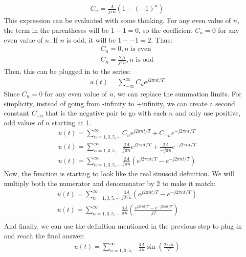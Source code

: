 \documentclass[12 pt]{article}
\begin{document}
\begin{align*}
    C_n=\frac{A}{j\pi n}\left(1-(-1)^n\right)
\end{align*}
This expression can be evaluated with some thinking. For any even value of $n$, the term in the parentheses will be
$1-1=0$, so the coefficient $C_n=0$ for any even value of $n$. If $n$ is odd, it will be $1--1=2$. Thus:
\begin{align*}
    C_n = 0, n \text{ is even} \\
    C_n =\frac{2A}{j\pi n}, n \text{ is odd}
\end{align*}
Then, this can be plugged in to the series:
\begin{align*}
    u(t)=\sum_{-\infty}^{\infty}C_ne^{j2\pi nt/T}
\end{align*}
Since $C_n=0$ for any even value of $n$, we can replace the summation limits. For simplicity, instead of going from
-infinity to +infinity, we can create a second constant $C_{-n}$ that is the negative pair to go with each $n$ and only
use positive, odd values of $n$ starting at 1.
\begin{align*}
    u(t)=\sum_{n=1,3,5,\cdots}^{\infty}C_ne^{j2\pi nt/T}+C_{-n}e^{-j2\pi nt/T} \\
    u(t)=\sum_{n=1,3,5,\cdots}^{\infty}\frac{2A}{j\pi n}e^{j2\pi nt/T} + \frac{2A}{-j\pi n}e^{-j2\pi nt/T} \\
    u(t)=\sum_{n=1,3,5,\cdots}^{\infty}\frac{2A}{j\pi n}\left(e^{j2\pi nt/T}-e^{-j2\pi nt/T}\right)
\end{align*}
Now, the function is starting to look like the real sinusoid definition. We will multiply both the numerator and
denomenator by 2 to make it match:
\begin{align*}
    u(t)=\sum_{n=1,3,5,\cdots}^{\infty}\frac{4A}{j2\pi n}\left(e^{j2\pi nt/T}-e^{-j2\pi nt/T}\right) \\
    u(t)=\sum_{n=1,3,5,\cdots}^{\infty}\frac{4A}{\pi n}\left(\frac{e^{j2\pi nt/T}-e^{-j2\pi nt/T}}{j2}\right) \\
\end{align*}
And finally, we can use the definition mentioned in the previous step to plug in and reach the final answer:
\begin{align*}
    u(t)=\sum_{n=1,3,5,\cdots}^{\infty}\frac{4A}{\pi n}\sin{\left(\frac{2\pi n t}{T}\right)}
\end{align*}
\end{document}
